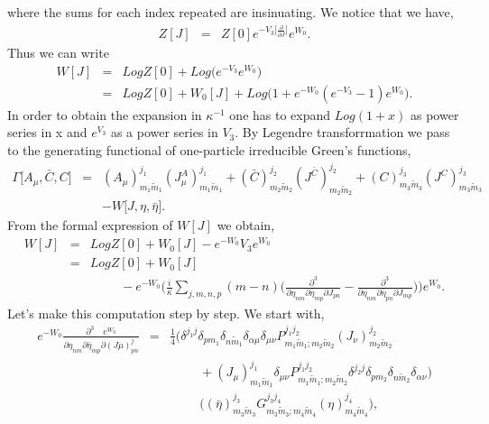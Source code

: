 \documentclass[a4paper,11pt]{article} %
\numberwithin{equation}{section} %
\numberwithin{figure}{section} %
\theoremstyle{plain} %
\theoremstyle{definition} %
\theoremstyle{remark} %
\begin{document}
where the sums for each index repeated are insinuating. We notice that we have,
\begin{eqnarray*}
 Z[J] &=&  Z[0] e^{-V_3 \Big[\frac{\partial}{\partial J} \Big]} e^{W_0}.
\end{eqnarray*}
Thus we can write 
\begin{eqnarray*}
 W[J] &=& Log Z[0] + Log\big( e^{-V_3} e^{W_{0}}  \big) \\
      &=& Log Z[0] + W_{0}[J] + Log\big( 1 + e^{-W_{0}} ( e^{-V_3} - 1 ) e^{W_{0}}  \big).
\end{eqnarray*}
In order to obtain the expansion in $\kappa^{-1}$ one has to expand $Log(1+x)$ as power series in x and $e^{V_3}$ as a power series in $V_3$. By Legendre transforrmation we pass to the generating functional of one-particle irreducible Green's functions,
\begin{eqnarray*}
 \Gamma[A_{\mu},\bar{C},C\big] &=& (A_\mu)^{j_1}_{m_1 \tilde{m}_1} (J^{A}_{\mu})^{j_1}_{m_1 \tilde{m}_1} + (\bar{C})^{j_2}_{m_2 \tilde{m}_2} (J^{\bar{C}})^{j_2}_{m_2 \tilde{m}_2} + (C)^{j_3}_{m_3 \tilde{m}_3} (J^{C})^{j_3}_{m_3 \tilde{m}_3} \\
                               && - W\big[J,\eta, \bar{\eta} \big] .                                          
\end{eqnarray*}
From the formal expression of $W[J]$ we obtain,
\begin{eqnarray*}
 W[J] &=& Log Z[0] + W_{0}[J] - e^{-W_{0}} V_3 e^{W_{0}} \\
      &=& Log Z[0] + W_{0}[J] \\
      && \hspace{1cm} - e^{-W_{0}} \Big( \frac{i}{\kappa} \sum_{j, m, n, p} (m-n) \Bigg( \frac{\partial^{3}}{\partial \eta_{n m} \partial \bar{\eta}_{mp} \partial J_{pn}} -  \frac{\partial^{3}}{\partial \eta_{n m} \partial \bar{\eta}_{pn} \partial J_{mp}} \Bigg) \Big) e^{W_{0}}.
\end{eqnarray*}
Let's make this computation step by step. We start with, 
\begin{eqnarray*}
 e^{-W_{0}} \frac{\partial^{3} \quad e^{W_{0}}}{\partial \eta_{n m} \partial \bar{\eta}_{mp} \partial (J{\mu})^{j}_{pn} } &=& \frac{1}{4}
 \Bigg( \delta^{j_1 j} \delta_{p m_1} \delta_{n \tilde{m}_1} \delta_{\alpha \mu} \delta_{\mu \nu} P^{j_1 j_2}_{m_1 \tilde{m}_1 ; m_2 \tilde{m}_2} (J_{\nu})^{j_2}_{m_2 \tilde{m}_2} \\
 && \hspace{1cm} +  (J_{\mu})^{j_1}_{m_1 \tilde{m}_1} \delta_{\mu \nu} P^{j_1 j_2}_{m_1 \tilde{m}_1 ; m_2 \tilde{m}_2}  \delta^{j_2 j} \delta_{p m_2} \delta_{n \tilde{m}_2} \delta_{\alpha \nu} \Bigg) \\
 && \hspace{1cm} \Bigg( (\bar{\eta})^{j_3}_{m_3 \tilde{m}_3} G^{j_3 j_4}_{m_3 \tilde{m}_3 ; m_4 \tilde{m}_4} (\eta)^{j_4}_{m_4 \tilde{m}_4}\Bigg),  
\end{eqnarray*}
\end{document}
